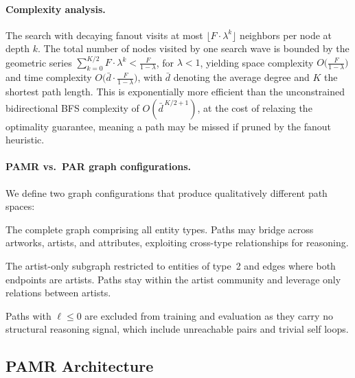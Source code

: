 \vspace{-1em}
\paragraph{Complexity analysis.}
The search with decaying fanout visits at most $\lfloor F \cdot \lambda^{k} \rfloor$ neighbors
per node at depth $k$.  The total number of nodes visited by one search wave is bounded by
the geometric series $\sum_{k=0}^{K/2} F \cdot \lambda^{k} < \frac{F}{1 - \lambda}$,
for $\lambda < 1$, yielding space complexity $O\bigl(\frac{F}{1-\lambda}\bigr)$ and
time complexity $O\bigl(\bar{d} \cdot \frac{F}{1-\lambda}\bigr)$, with $\bar{d}$ denoting the
average degree and $K$ the shortest path length.  This is exponentially more efficient than
the unconstrained bidirectional BFS complexity of $O(\bar{d}^{\,K/2 + 1})$, at the cost of
relaxing the optimality guarantee, meaning a path may be missed if pruned by the fanout heuristic.

\vspace{-1em}
\paragraph{PAMR vs.\ PAR graph configurations.}
We define two graph configurations that produce qualitatively different path spaces:
\begin{description}[nosep]
    \item[$\mathcal{G}_{\text{full}}$ (PAMR).]  The complete graph comprising all entity types.
    Paths may bridge across artworks, artists, and attributes, exploiting cross-type
    relationships for reasoning.
    \item[$\mathcal{G}_{\text{artist}}$ (PAR).]  The artist-only subgraph restricted to
    entities of type~2 and edges where both endpoints are artists.  Paths stay within the
    artist community and leverage only relations between artists.
\end{description}
Paths with $\ell \leq 0$ are excluded from training and evaluation as they carry no
structural reasoning signal, which include unreachable pairs and trivial self loops.

\vspace{-1em}
\subsection{PAMR Architecture}
\vspace{-1em}
\label{sec:pamr-architecture}

